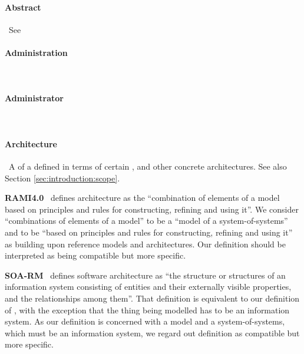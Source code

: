 %
%

{

\newcommand{\GlossaryEntry}[2]{\paragraph{#2}\label{sec:glossary:#1}\,}
\newcommand{\GlossaryNote}[2]{\begin{minipage}[b]{\dimexpr\linewidth-0.5cm\relax}\vspace*{0.33cm}\footnotesize{\textbf{#1}\ #2}\end{minipage}}

\GlossaryEntry{abstract}{Abstract}
See 

\GlossaryEntry{administration}{Administration}

\GlossaryEntry{administrator}{Administrator}

\GlossaryEntry{architecture}{Architecture}
A  of a  defined in terms of certain ,  and other concrete architectures.
See also Section \ref{sec:introduction:scope}.

	\GlossaryNote{RAMI4.0}{
	    defines architecture as the ``combination of elements of a model based on principles and rules for constructing, refining and using it''.
		We consider ``combinations of elements of a model'' to be a ``model of a system-of-systems'' and to be ``based on principles and rules for constructing, refining and using it'' as building upon reference models and architectures.
		Our definition should be interpreted as being compatible but more specific.
	}

	\GlossaryNote{SOA-RM}{
		defines software architecture as ``the structure or structures of an information system consisting of entities and their externally visible properties, and the relationships among them''.
		That definition is equivalent to our definition of \GlossaryHyperRef{model}{model}, with the exception that the thing being modelled has to be an information system.
		As our definition is concerned with a model and a system-of-systems, which must be an information system, we regard out definition as compatible but more specific.
	}

}
